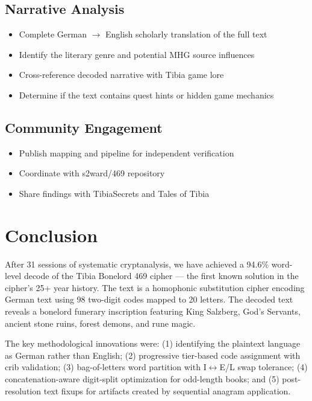 \documentclass[11pt,a4paper]{article}
\begin{document}
\subsection{Narrative Analysis}

\begin{itemize}
\item Complete German $\rightarrow$ English scholarly translation of the full text
\item Identify the literary genre and potential MHG source influences
\item Cross-reference decoded narrative with Tibia game lore
\item Determine if the text contains quest hints or hidden game mechanics
\end{itemize}

\subsection{Community Engagement}

\begin{itemize}
\item Publish mapping and pipeline for independent verification
\item Coordinate with s2ward/469 repository
\item Share findings with TibiaSecrets and Tales of Tibia
\end{itemize}

\section{Conclusion}

After 31 sessions of systematic cryptanalysis, we have achieved a 94.6\% word-level decode of the Tibia Bonelord 469 cipher --- the first known solution in the cipher's 25+ year history. The text is a homophonic substitution cipher encoding German text using 98 two-digit codes mapped to 20 letters. The decoded text reveals a bonelord funerary inscription featuring King Salzberg, God's Servants, ancient stone ruins, forest demons, and rune magic.

The key methodological innovations were: (1) identifying the plaintext language as German rather than English; (2) progressive tier-based code assignment with crib validation; (3) bag-of-letters word partition with I$\leftrightarrow$E/L swap tolerance; (4) concatenation-aware digit-split optimization for odd-length books; and (5) post-resolution text fixups for artifacts created by sequential anagram application.
\end{document}
